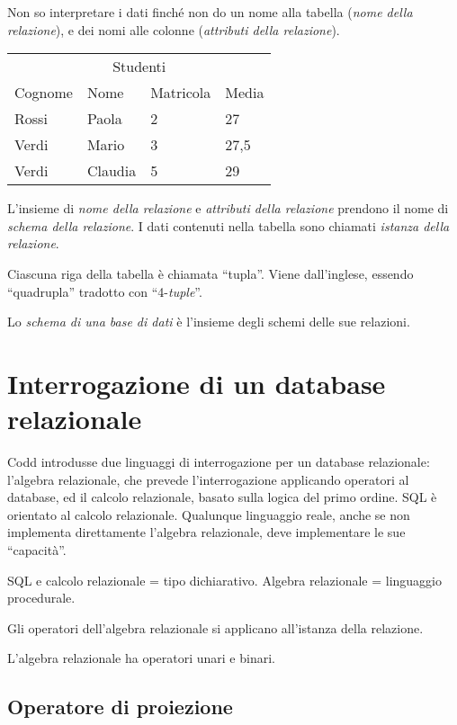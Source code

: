 Non so interpretare i dati finch\'e non do un nome alla tabella (\emph{nome della relazione}), e dei nomi alle colonne (\emph{attributi della relazione}).

\begin{center}
\begin{tabular}{llll}
\multicolumn{4}{c}{Studenti} \\
Cognome & Nome & Matricola & Media \\
\hline
Rossi & Paola & 2 & 27 \\
Verdi & Mario & 3 & 27,5 \\
Verdi & Claudia & 5 & 29 \\
\end{tabular}
\end{center}

L'insieme di \emph{nome della relazione} e \emph{attributi della relazione} prendono il nome di \emph{schema della relazione}. I dati contenuti nella tabella sono chiamati \emph{istanza della relazione}.

Ciascuna riga della tabella \`e chiamata ``tupla''. Viene dall'inglese, essendo ``quadrupla'' tradotto con ``4-\emph{tuple}''.

Lo \emph{schema di una base di dati} \`e l'insieme degli schemi delle sue relazioni.

\section{Interrogazione di un database relazionale}

Codd introdusse due linguaggi di interrogazione per un database relazionale: l'algebra relazionale, che prevede l'interrogazione applicando operatori al database, ed il calcolo relazionale, basato sulla logica del primo ordine. SQL \`e orientato al calcolo relazionale. Qualunque linguaggio reale, anche se non implementa direttamente l'algebra relazionale, deve implementare le sue ``capacit\`a''.

SQL e calcolo relazionale = tipo dichiarativo. Algebra relazionale = linguaggio procedurale.

Gli operatori dell'algebra relazionale si applicano all'istanza della relazione.

L'algebra relazionale ha operatori unari e binari.

\subsection{Operatore di proiezione}

